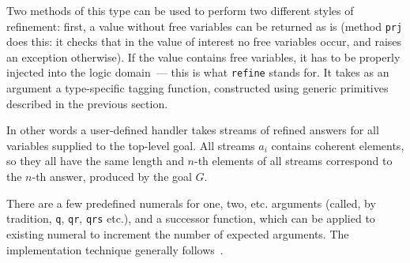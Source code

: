 Two methods of this type can be used to perform two different styles of refinement: first, a value without
free variables can be returned as is (method \lstinline{prj} does this: it checks that in the value of
interest no free variables occur, and raises an exception otherwise). If the value contains free
variables, it has to be properly injected into the logic domain~--- this is what \lstinline{refine} stands
for. It takes as an argument a type-specific tagging function, constructed using generic
primitives described in the previous section.

In other words a user-defined handler takes streams of refined answers for all variables supplied to the top-level
goal. All streams $a_i$ contains coherent elements, so they all have the same length and $n$-th elements of all
streams correspond to the $n$-th answer, produced by the goal $G$.

There are a few predefined numerals for one, two, etc. arguments (called, by tradition,
\lstinline{q}, \lstinline{qr}, \lstinline{qrs} etc.), and a successor function, which
can be applied to existing numeral to increment the number of expected arguments. The
implementation technique generally follows~\cite{Unparsing, DoWeNeed}.
